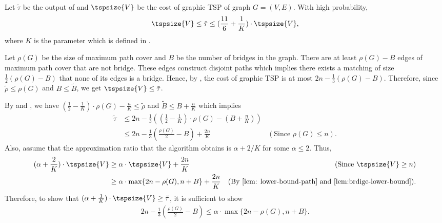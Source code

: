 \begin{lemma}\label{lem: graphic-tsp-approx2}
Let $\tilde{\tau}$ be the output of  and $\tspsize{V}$ be the cost of graphic TSP of graph $G = (V, E)$. With high probability,
$$
\tspsize{V} \leq \tilde{\tau} \leq (\frac{11}{6} + \frac{1}{K}) \cdot \tspsize{V},
$$
where $K$ is the parameter which is defined in \algtwo{}.
\end{lemma}
\begin{myproof}
Let $\rho(G)$ be the size of maximum path cover and $B$ be the number of bridges in the graph. There are at least $\rho(G) - B$ edges of maximum path cover that are not bridge. These edges construct disjoint paths which implies there exists a matching of size $\frac{1}{2}(\rho(G) - B)$ that none of its edges is a bridge. Hence, by , the cost of graphic TSP is at most $2n - \frac{1}{3}(\rho(G) - B)$. Therefore, since $\tilde{\rho} \leq \rho(G)$ and $B \leq \tilde{B}$, we get $\tspsize{V} \leq \tilde{\tau}$.

By  and , we have $\left(\frac{1}{2} - \frac{1}{K} \right)\cdot\rho(G) - \frac{n}{K}\leq \tilde{\rho}$ and $\tilde{B} \leq B + \frac{n}{K}$ which implies
\begin{align*}
    \tilde{\tau} & \leq 2n - \frac{1}{3}\left( (\frac{1}{2} - \frac{1}{K})\cdot\rho(G) - (B + \frac{n}{K}) \right) \\
    & \leq 2n - \frac{1}{3}(\frac{\rho(G)}{2} - B) + \frac{2n}{K} & (\text{Since } \rho(G) \leq n).
\end{align*}
Also, assume that the approximation ratio that the algorithm obtains is $\alpha + 2/K$ for some $\alpha \leq 2$. Thus,
\begin{align*}
    (\alpha + \frac{2}{K}) \cdot \tspsize{V} & \geq \alpha \cdot \tspsize{V} + \frac{2n}{K} & (\text{Since } \tspsize{V} \geq n) \\ 
    & \geq \alpha\cdot \max\{2n - \rho(G), n + B\} + \frac{2n}{K} & (\text{By \Cref{lem: lower-bound-path}  and  \Cref{lem:brdige-lower-bound}}).
\end{align*}
Therefore, to show that $(\alpha + \frac{1}{K})\cdot\tspsize{V} \geq \tilde{\tau}$, it is sufficient to show 
\begin{align*}
    2n - \frac{1}{3}(\frac{\rho(G)}{2} - B) \leq \alpha\cdot \max\{2n - \rho(G), n + B\}.
\end{align*}


\end{myproof}

